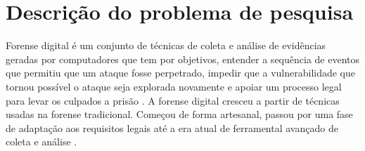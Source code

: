 \documentclass[12pt,				%
	openright,			%
	oneside,			%
	a4paper,			%
	english,			%
	brazil				%
	]{abntex2}
\begin{document}



\textual

\chapter{Descrição do problema de pesquisa} \label{chap:intro}
%
Forense digital é um conjunto de técnicas de coleta e análise de evidências geradas por computadores que tem por objetivos, entender a sequência de eventos que permitiu que um 
ataque fosse perpetrado, impedir que a vulnerabilidade que tornou possível o ataque seja explorada novamente e apoiar um processo legal para levar os culpados a prisão \cite{Sang2013}. 
A forense digital cresceu a partir de técnicas usadas na forense tradicional. Começou de forma artesanal, passou por uma fase de adaptação aos requisitos legais até a era atual
de ferramental avançado de coleta e análise \cite{Charters2008}.
\end{document}
